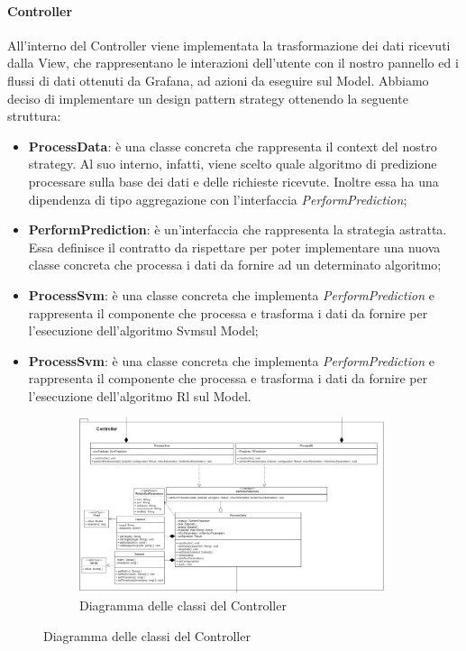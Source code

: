 \paragraph{Controller} \mbox{}
All'interno del Controller viene implementata la trasformazione dei dati ricevuti dalla View, che rappresentano le interazioni dell'utente con il nostro pannello ed i flussi di dati ottenuti da Grafana\glo, ad azioni da eseguire sul Model.
Abbiamo deciso di implementare un design pattern strategy ottenendo la seguente struttura:
\begin{itemize}
	\item \textbf{ProcessData}: è una classe concreta che rappresenta il context del nostro strategy. Al suo interno, infatti, viene scelto quale algoritmo di predizione processare sulla base dei dati e delle richieste ricevute. Inoltre essa ha una dipendenza di tipo aggregazione con l'interfaccia \textit{PerformPrediction};
	\item \textbf{PerformPrediction}: è un'interfaccia che rappresenta la strategia astratta. Essa definisce il contratto da rispettare per poter implementare una nuova classe concreta che processa i dati da fornire ad un determinato algoritmo;
	\item \textbf{ProcessSvm}: è una classe concreta che implementa \textit{PerformPrediction} e rappresenta il componente che processa e trasforma i dati da fornire per l'esecuzione dell'algoritmo Svm\glosp sul Model;
	\item \textbf{ProcessSvm}: è una classe concreta che implementa \textit{PerformPrediction} e rappresenta il componente che processa e trasforma i dati da fornire per l'esecuzione dell'algoritmo Rl sul Model.
\end{itemize}
\mbox{}
\begin{landscape}
	\begin{figure}
		\begin{figure} [H]
			\includegraphics[width=\linewidth]{./img/Diagrammi/controller-plug-in.png}
			\caption{Diagramma delle classi del Controller}
		\end{figure}
	\end{figure}
\end{landscape}
